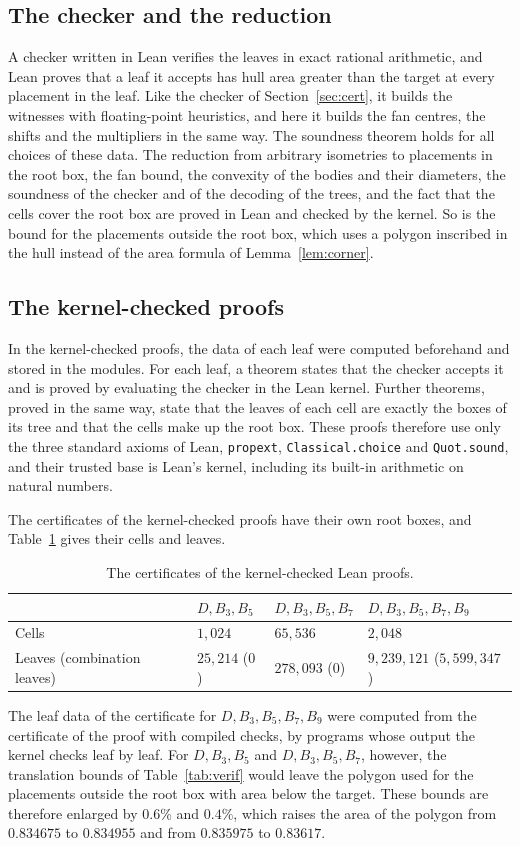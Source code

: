 \documentclass[11pt]{amsart}
\theoremstyle{definition}
\theoremstyle{remark}
\numberwithin{equation}{section}
\newcommand{\CellsK}{1{,}024}
\newcommand{\LeavesK}{25{,}214}
\newcommand{\CellsKE}{65{,}536}
\newcommand{\LeavesKE}{278{,}093}
\newcommand{\LeavesKEl}{9{,}239{,}121}
\newcommand{\CombLeavesKEl}{5{,}599{,}347}
\begin{document}
\subsection{The checker and the reduction}
A checker written in Lean verifies the leaves in exact rational arithmetic, and Lean proves that a leaf it accepts has hull area greater than the target at every placement in the leaf. Like the checker of Section~\ref{sec:cert}, it builds the witnesses with floating-point heuristics, and here it builds the fan centres, the shifts and the multipliers in the same way. The soundness theorem holds for all choices of these data. The reduction from arbitrary isometries to placements in the root box, the fan bound, the convexity of the bodies and their diameters, the soundness of the checker and of the decoding of the trees, and the fact that the cells cover the root box are proved in Lean and checked by the kernel. So is the bound for the placements outside the root box, which uses a polygon inscribed in the hull instead of the area formula of Lemma~\ref{lem:corner}.

\subsection{The kernel-checked proofs}
In the kernel-checked proofs, the data of each leaf were computed beforehand and stored in the modules. For each leaf, a theorem states that the checker accepts it and is proved by evaluating the checker in the Lean kernel. Further theorems, proved in the same way, state that the leaves of each cell are exactly the boxes of its tree and that the cells make up the root box. These proofs therefore use only the three standard axioms of Lean, \texttt{propext}, \texttt{Classical.choice} and \texttt{Quot.sound}, and their trusted base is Lean's kernel, including its built-in arithmetic on natural numbers.

The certificates of the kernel-checked proofs have their own root boxes, and Table~\ref{tab:lean} gives their cells and leaves.

\begin{table}[ht]
\centering
\caption{The certificates of the kernel-checked Lean proofs.}\label{tab:lean}
\scriptsize
\begin{tabular}{@{}llll@{}}
\toprule
& $D,B_3,B_5$ & $D,B_3,B_5,B_7$ & $D,B_3,B_5,B_7,B_9$\\
\midrule
Cells & $\CellsK$ & $\CellsKE$ & $2{,}048$\\
Leaves (combination leaves) & $\LeavesK$ ($0$) & $\LeavesKE$ ($0$) & $\LeavesKEl$ ($\CombLeavesKEl$)\\
\bottomrule
\end{tabular}
\end{table}
 The leaf data of the certificate for $D,B_3,B_5,B_7,B_9$ were computed from the certificate of the proof with compiled checks, by programs whose output the kernel checks leaf by leaf. For $D,B_3,B_5$ and $D,B_3,B_5,B_7$, however, the translation bounds of Table~\ref{tab:verif} would leave the polygon used for the placements outside the root box with area below the target. These bounds are therefore enlarged by $0.6\%$ and $0.4\%$, which raises the area of the polygon from $0.834675$ to $0.834955$ and from $0.835975$ to $0.83617$.
\end{document}
